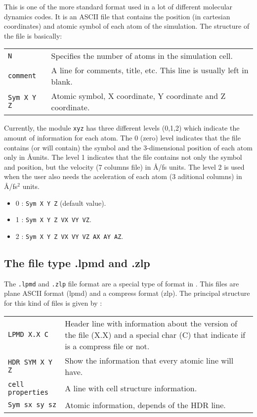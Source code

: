 This is one of the more standard format used in a lot of different molecular
dynamics codes. It is an ASCII file that contains the position (in cartesian
coordinates) and atomic symbol of each atom of the simulation. The structure of
the file is basically:

\begin{center}
\begin{tabular}{l|l}
 \verb|N| & Specifies the number of atoms in the simulation cell.\\
 \verb|comment| & A line for comments, title, etc. This line is usually left
in blank.\\
 \verb|Sym X Y Z| & Atomic symbol, X coordinate, Y coordinate and Z coordinate.
  \\
\end{tabular}
\end{center}

Currently, the module \verb|xyz| has three different levels (0,1,2) which 
indicate the amount of information for each atom. The 0 (zero) level indicates
that the file contains (or will contain) the symbol and the 3-dimensional
position of each atom only in \AA units. The level 1 indicates that the file
contains not only the symbol and position, but the velocity (7 columns
file) in \AA/fs units. The level 2 is used when the user also needs the
aceleration of each atom (3 aditional columns) in \AA/fs$^2$ units.

\begin{itemize}
\item 0 : \verb|Sym X Y Z| (default value).
\item 1 : \verb|Sym X Y Z VX VY VZ|.
\item 2 : \verb|Sym X Y Z VX VY VZ AX AY AZ|.
\end{itemize}

\subsection{The file type .lpmd and .zlp}

The \verb|.lpmd| and \verb|.zlp| file format are a special type of format in
{\lpmd}. This files are plane ASCII format (lpmd) and a compress format (zlp).
The principal structure for this kind of files is given by :

\begin{center}
 \begin{tabular}{l|l}
 \verb|LPMD X.X C| & Header line with information about the version of the file
(X.X) and a special char (C) that indicate if is a compress file or not. \\
 \verb|HDR SYM X Y Z| & Show the information that every atomic line will have.\\
 \verb|cell properties | & A line with cell structure information. \\
 \verb|Sym sx sy sz| & Atomic information, depends of the HDR line.\\
\end{tabular}
\end{center}

